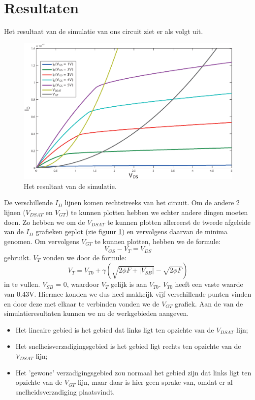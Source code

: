 \documentclass{scrartcl}  %
\begin{document}
\section{Resultaten}
Het resultaat van de simulatie van ons circuit ziet er als volgt uit.
\begin{figure}[H]
\centering
		\includegraphics[width=\textwidth]{resources/Id}
		\caption{Het resultaat van de simulatie.}
		\label{fig:Id}
\end{figure}
De verschillende $I_{D}$ lijnen komen rechtstreeks van het circuit. Om de andere 2 lijnen ($V_{DSAT}$ en $V_{GT}$) te kunnen plotten hebben we echter andere dingen moeten doen. Zo hebben we om de $V_{DSAT}$ te kunnen plotten allereerst de tweede afgeleide van de $I_{D}$ grafieken geplot (zie figuur \ref{fig:Id}) en vervolgens daarvan de minima genomen. 
Om vervolgens $V_{GT}$ te kunnen plotten, hebben we de formule: 
\begin{equation}
V_{GS} - V_{T} = V_{DS} 
\end{equation} gebruikt.
\newline $V_{T}$ vonden we door de formule: 
\begin{equation}
V_{T} = V_{T0} + \gamma (\sqrt {2 \phi F + |V_{SB}|} - \sqrt{ 2 \phi F} ) 
\end{equation} in te vullen. $V_{SB}$ = 0, waardoor $V_{T}$  gelijk is aan $V_{T0}$. $V_{T0}$ heeft een vaste waarde van 0.43V. Hiermee konden we dus heel makkeijk vijf verschillende punten vinden en door deze met elkaar te verbinden vonden we de $V_{GT}$ grafiek. 
\newline Aan de van de simulatieresultaten kunnen we nu de werkgebieden aangeven.
\begin{itemize}
	\item Het lineaire gebied is het gebied dat links ligt ten opzichte van de $V_{DSAT}$ lijn;
	\item Het snelheisverzadigingsgebied is het gebied ligt rechts ten opzichte van de $V_{DSAT}$ lijn;
	\item Het 'gewone' verzadigingsgebied zou normaal het gebied zijn dat links ligt ten opzichte van de $V_{GT}$ lijn, maar daar is hier geen sprake van, omdat er al snelheidsverzadiging plaatsvindt.
\end{itemize}
\end{document}
